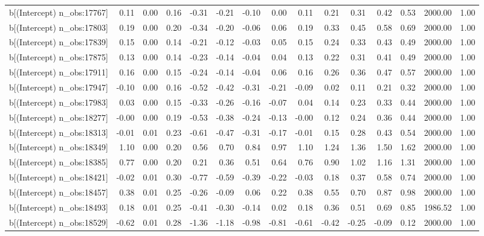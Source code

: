 \begin{table}[ht]
\begin{tabular}{rrrrrrrrrrrrrrr}
  b[(Intercept) n\_obs:17767] & 0.11 & 0.00 & 0.16 & -0.31 & -0.21 & -0.10 & 0.00 & 0.11 & 0.21 & 0.31 & 0.42 & 0.53 & 2000.00 & 1.00 \\ 
  b[(Intercept) n\_obs:17803] & 0.19 & 0.00 & 0.20 & -0.34 & -0.20 & -0.06 & 0.06 & 0.19 & 0.33 & 0.45 & 0.58 & 0.69 & 2000.00 & 1.00 \\ 
  b[(Intercept) n\_obs:17839] & 0.15 & 0.00 & 0.14 & -0.21 & -0.12 & -0.03 & 0.05 & 0.15 & 0.24 & 0.33 & 0.43 & 0.49 & 2000.00 & 1.00 \\ 
  b[(Intercept) n\_obs:17875] & 0.13 & 0.00 & 0.14 & -0.23 & -0.14 & -0.04 & 0.04 & 0.13 & 0.22 & 0.31 & 0.41 & 0.49 & 2000.00 & 1.00 \\ 
  b[(Intercept) n\_obs:17911] & 0.16 & 0.00 & 0.15 & -0.24 & -0.14 & -0.04 & 0.06 & 0.16 & 0.26 & 0.36 & 0.47 & 0.57 & 2000.00 & 1.00 \\ 
  b[(Intercept) n\_obs:17947] & -0.10 & 0.00 & 0.16 & -0.52 & -0.42 & -0.31 & -0.21 & -0.09 & 0.02 & 0.11 & 0.21 & 0.32 & 2000.00 & 1.00 \\ 
  b[(Intercept) n\_obs:17983] & 0.03 & 0.00 & 0.15 & -0.33 & -0.26 & -0.16 & -0.07 & 0.04 & 0.14 & 0.23 & 0.33 & 0.44 & 2000.00 & 1.00 \\ 
  b[(Intercept) n\_obs:18277] & -0.00 & 0.00 & 0.19 & -0.53 & -0.38 & -0.24 & -0.13 & -0.00 & 0.12 & 0.24 & 0.36 & 0.44 & 2000.00 & 1.00 \\ 
  b[(Intercept) n\_obs:18313] & -0.01 & 0.01 & 0.23 & -0.61 & -0.47 & -0.31 & -0.17 & -0.01 & 0.15 & 0.28 & 0.43 & 0.54 & 2000.00 & 1.00 \\ 
  b[(Intercept) n\_obs:18349] & 1.10 & 0.00 & 0.20 & 0.56 & 0.70 & 0.84 & 0.97 & 1.10 & 1.24 & 1.36 & 1.50 & 1.62 & 2000.00 & 1.00 \\ 
  b[(Intercept) n\_obs:18385] & 0.77 & 0.00 & 0.20 & 0.21 & 0.36 & 0.51 & 0.64 & 0.76 & 0.90 & 1.02 & 1.16 & 1.31 & 2000.00 & 1.00 \\ 
  b[(Intercept) n\_obs:18421] & -0.02 & 0.01 & 0.30 & -0.77 & -0.59 & -0.39 & -0.22 & -0.03 & 0.18 & 0.37 & 0.58 & 0.74 & 2000.00 & 1.00 \\ 
  b[(Intercept) n\_obs:18457] & 0.38 & 0.01 & 0.25 & -0.26 & -0.09 & 0.06 & 0.22 & 0.38 & 0.55 & 0.70 & 0.87 & 0.98 & 2000.00 & 1.00 \\ 
  b[(Intercept) n\_obs:18493] & 0.18 & 0.01 & 0.25 & -0.41 & -0.30 & -0.14 & 0.02 & 0.18 & 0.36 & 0.51 & 0.69 & 0.85 & 1986.52 & 1.00 \\ 
  b[(Intercept) n\_obs:18529] & -0.62 & 0.01 & 0.28 & -1.36 & -1.18 & -0.98 & -0.81 & -0.61 & -0.42 & -0.25 & -0.09 & 0.12 & 2000.00 & 1.00 \\ 

\end{tabular}
\end{table}
